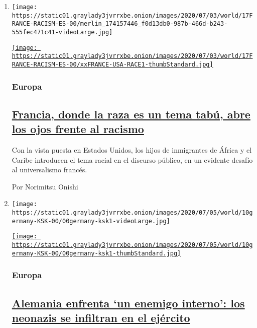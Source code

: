 \begin{enumerate}
\def\labelenumi{\arabic{enumi}.}
\item
  \texttt{[image: https://static01.graylady3jvrrxbe.onion/images/2020/07/03/world/17FRANCE-RACISM-ES-00/merlin\_174157446\_f0d13db0-987b-466d-b243-555fec471c41-videoLarge.jpg]}

  \href{/es/2020/07/17/espanol/mundo/racismo-francia-protestas.html}{\texttt{[image: https://static01.graylady3jvrrxbe.onion/images/2020/07/03/world/17FRANCE-RACISM-ES-00/xxFRANCE-USA-RACE1-thumbStandard.jpg]}}

  \hypertarget{europa}{%
  \subsubsection{Europa}\label{europa}}

  \hypertarget{francia-donde-la-raza-es-un-tema-tabuxfa-abre-los-ojos-frente-al-racismo}{%
  \subsection{\texorpdfstring{\href{/es/2020/07/17/espanol/mundo/racismo-francia-protestas.html}{Francia,
  donde la raza es un tema tabú, abre los ojos frente al
  racismo}}{Francia, donde la raza es un tema tabú, abre los ojos frente al racismo}}\label{francia-donde-la-raza-es-un-tema-tabuxfa-abre-los-ojos-frente-al-racismo}}

  Con la vista puesta en Estados Unidos, los hijos de inmigrantes de
  África y el Caribe introducen el tema racial en el discurso público,
  en un evidente desafío al universalismo francés.

  Por Norimitsu Onishi
\item
  \texttt{[image: https://static01.graylady3jvrrxbe.onion/images/2020/07/05/world/10germany-KSK-00/00germany-ksk1-videoLarge.jpg]}

  \href{/es/2020/07/10/espanol/mundo/alemania-ksk-neonazi.html}{\texttt{[image: https://static01.graylady3jvrrxbe.onion/images/2020/07/05/world/10germany-KSK-00/00germany-ksk1-thumbStandard.jpg]}}

  \hypertarget{europa-1}{%
  \subsubsection{Europa}\label{europa-1}}

  \hypertarget{alemania-enfrenta-un-enemigo-interno-los-neonazis-se-infiltran-en-el-ejuxe9rcito}{%
  \subsection{\texorpdfstring{\href{/es/2020/07/10/espanol/mundo/alemania-ksk-neonazi.html}{Alemania
  enfrenta `un enemigo interno': los neonazis se infiltran en el
  ejército}}{Alemania enfrenta `un enemigo interno': los neonazis se infiltran en el ejército}}\label{alemania-enfrenta-un-enemigo-interno-los-neonazis-se-infiltran-en-el-ejuxe9rcito}}


\end{enumerate}
